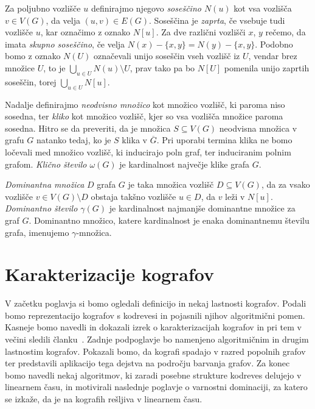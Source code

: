 \documentclass[12pt,a4paper,twoside]{article}
\theoremstyle{definition} %
\theoremstyle{plain} %
\numberwithin{equation}{section}  %
\begin{document}
Za poljubno vozlišče $u$ definirajmo njegovo \emph{soseščino $N(u)$} kot vsa vozlišča $v \in V(G)$, da velja $(u,v) \in E(G)$. Soseščina je \emph{zaprta}, če vsebuje tudi vozlišče $u$, kar označimo z oznako $N[u]$. Za dve različni vozlišči $x$, $y$ rečemo, da imata \emph{skupno soseščino}, če velja $N(x) - \{x,y\} = N(y) - \{x,y\}$. Podobno bomo z oznako $N(U)$ označevali unijo soseščin vseh vozlišč iz $U$, vendar brez množice $U$, to je $\bigcup_{u \in U}N(u) \setminus U$, prav tako pa bo $N[U]$ pomenila unijo zaprtih soseščin, torej $\bigcup_{u \in U}N[u]$. 

Nadalje definirajmo \emph{neodvisno množico} kot množico vozlišč, ki paroma niso sosedna, ter \emph{kliko} kot množico vozlišč, kjer so vsa vozlišča množice paroma sosedna. Hitro se da preveriti, da je množica $S\subseteq V(G)$ neodvisna množica v grafu $G$ natanko tedaj, ko je $S$ klika v $\overline{G}$. Pri uporabi termina klika ne bomo ločevali med množico vozlišč, ki inducirajo poln graf, ter induciranim polnim grafom. \emph{Klično število $\omega(G)$} je kardinalnost največje klike grafa $G$.

\emph{Dominantna množica} $D$ grafa $G$ je taka množica vozlišč $D \subseteq V(G)$, da za vsako vozlišče $v \in V(G) \setminus D$ obstaja takšno vozlišče $u \in D$, da $v$ leži v $N[u]$. \emph{Dominantno število $\gamma(G)$}  je kardinalnost najmanjše dominantne množice za graf $G$. Dominantno množico, katere kardinalnost je enaka dominantnemu številu grafa, imenujemo $\gamma$-množica.

\section{Karakterizacije kografov}
V začetku poglavja si bomo ogledali definicijo in nekaj lastnosti kografov. Podali bomo reprezentacijo kografov s kodrevesi in pojasnili njihov algoritmični pomen. Kasneje bomo navedli in dokazali izrek o karakterizacijah kografov in pri tem v večini sledili članku~\cite{corneil1981complement}. Zadnje podpoglavje bo namenjeno algoritmičnim in drugim lastnostim kografov. Pokazali bomo, da kografi spadajo v razred popolnih grafov ter predstavili aplikacijo tega dejstva na področju barvanja grafov. Za konec bomo navedli nekaj algoritmov, ki zaradi posebne strukture kodreves delujejo v linearnem času, in motivirali naslednje poglavje o varnostni dominaciji, za katero se izkaže, da je na kografih rešljiva v linearnem času.
\end{document}

